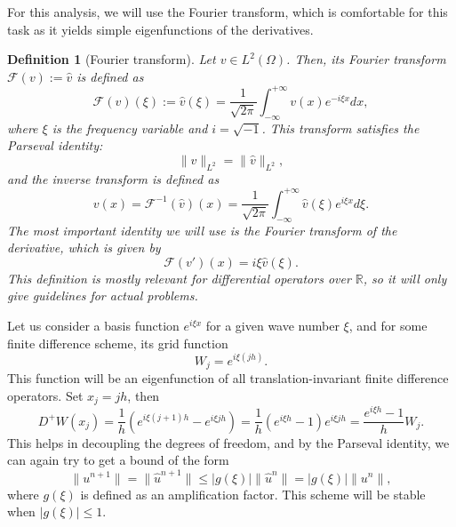 \documentclass{article}
\newtheorem{definition}{Definition}
\newcommand{\R}{\mathbb{R}}
\begin{document}
For this analysis, we will use the Fourier transform, which is comfortable for this task as it yields simple eigenfunctions of the derivatives. 

\begin{definition}[Fourier transform]
    Let $v\in L^2(\Omega)$. Then, its Fourier transform $\mathcal{F}(v) := \hat{v}$ is defined as
    $$ \mathcal{F}(v)(\xi) := \hat{v}(\xi) = \frac{1}{\sqrt{2\pi}}\int_{-\infty}^{+\infty} v(x)e^{-i\xi x}dx, $$
    where $\xi$ is the frequency variable and $i=\sqrt{-1}$. This transform satisfies the Parseval identity:
    $$ \| v\|_{L^2} = \| \hat{v}\|_{L^2}, $$
    and the inverse transform is defined as
    $$ v(x) = \mathcal{F}^{-1}(\hat{v})(x) = \frac{1}{\sqrt{2\pi}}\int_{-\infty}^{+\infty} \hat{v}(\xi)e^{i\xi x}d\xi. $$
    The most important identity we will use is the Fourier transform of the derivative, which is given by
    $$ \mathcal{F}(v')(x) = i\xi \hat{v}(\xi). $$
    This definition is mostly relevant for differential operators over $\R$, so it will only give guidelines for actual problems.
\end{definition}
Let us consider a basis function $e^{i\xi x}$ for a given wave number $\xi$, and for some finite difference scheme, its grid function
$$W_j = e^{i\xi (jh)}.$$
This function will be an eigenfunction of all translation-invariant finite difference operators. Set $x_j = jh$, then
$$D^+ W(x_j) = \frac{1}{h}\left(e^{i\xi (j+1)h} - e^{i\xi j h}\right) = \frac{1}{h}\left(e^{i\xi h} - 1\right)e^{i\xi j h} = \frac{e^{i\xi h} - 1}{h}W_j.$$
This helps in decoupling the degrees of freedom, and by the Parseval identity, we can again try to get a bound of the form
$$\|u^{n+1}\| = \|\hat{u}^{n+1}\|\leq |g(\xi)| \|\hat{u}^{n}\| = |g(\xi)| \|u^n\|,$$
where $g(\xi)$ is defined as an amplification factor. This scheme will be stable when $|g(\xi)|\leq 1$.
\end{document}
